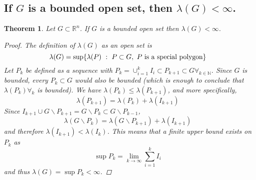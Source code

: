 \documentclass[]{article}
\newcommand{\R}{\mathbb{R}}
\newcommand{\N}{\mathbb{N}}
\newcommand{\st}{\ : \ }
\newtheorem{theorem}{Theorem}
\begin{document}
\subsection{If $G$ is a bounded open set, then $\lambda(G) < \infty$.}
\begin{theorem}
    Let $G \subset \R^n$.
    If $G$ is a bounded open set then $\lambda(G) < \infty$.
    \begin{proof}
        The definition of $\lambda(G)$ as an open set is \[
            \lambda(G) = \sup \{
                \lambda(P) \st P \subset G, \ P \textnormal{ is a special polygon}
            \}
        \] Let $P_k$ be defined as a sequence with $P_k = \cup_{i=1}^{k} I_i \subset P_{k+1} \subset G \forall_{k \in \N}$.
        Since $G$ is bounded, every $P_{k} \subset G$ would also be bounded (which is enough to conclude that $\lambda(P_k) \forall_{k}$ is bounded).
        We have $\lambda(P_k) \leq \lambda(P_{k+1})$, and more specifically,\[
            \lambda(P_{k+1}) = \lambda(P_{k}) + \lambda(I_{k+1})
        \] Since $I_{k+1} \cup G \backslash P_{k+1} = G \backslash P_{k} \subset G \backslash P_{k-1}$, \[
            \lambda(G \backslash P_{k}) = \lambda(G \backslash P_{k+1}) + \lambda(I_{k+1})
        \] and therefore $\lambda(I_{k+1}) < \lambda(I_{k})$. 
        This means that a finite upper bound exists on $P_k$ as \[
            \sup{P_k} = \lim_{k\to \infty} \sum_{i=1}^k I_i
        \] and thus $\lambda(G) = \sup{P_k} < \infty$.
    \end{proof}
\end{theorem}
\end{document}
